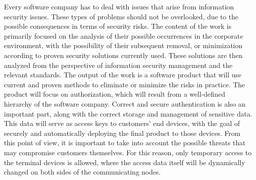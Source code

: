 \newpage
\thispagestyle{plain}
Every software company has to deal with issues that arise from information security issues. These types of problems should
not be overlooked, due to the possible consequences in terms of security risks. The content of the work is primarily focused
on the analysis of their possible occurrences in the corporate environment, with the possibility of their subsequent removal,
or minimization according to proven security solutions currently used. These solutions are then analyzed from the perspective
of information security management and the relevant standards. The output of the work is a software product that will use
current and proven methods to eliminate or minimize the risks in practice. The product will focus on authorization, which
will result from a well-defined hierarchy of the software company. Correct and secure authentication is also an important
part, along with the correct storage and management of sensitive data. This data will serve as access keys to customers'
end devices, with the goal of securely and automatically deploying the final product to those devices. From this point
of view, it is important to take into account the possible threats that may compromise customers themselves. For this
reason, only temporary access to the terminal devices is allowed, where the access data itself will be dynamically
changed on both sides of the communicating nodes.
\emptypage
